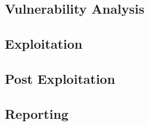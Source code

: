 \subsection{Vulnerability Analysis}
\todo

\subsection{Exploitation}
\todo

\subsection{Post Exploitation}
\todo

\subsection{Reporting}
\todo

